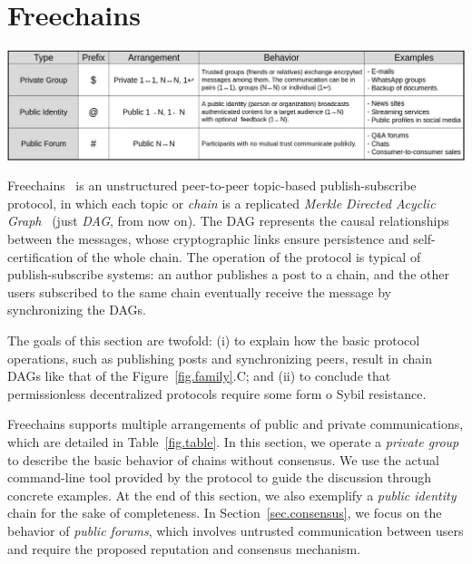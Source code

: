 \documentclass[10pt,journal,compsoc]{IEEEtran}
\newcommand{\FC}       {Freechains\xspace}
\begin{document}

\section{\FC}
\label{sec.freechains}

\begin{table}
\centering
\includegraphics[width=\textwidth]{arrangements.png}
\caption{The three types of chains and arrangements in \FC.}
\label{fig.table}
\end{table}

\FC~\cite{fcs.sbseg20} is an unstructured peer-to-peer topic-based
publish-subscribe protocol, in which each topic or \emph{chain} is a replicated
\emph{Merkle Directed Acyclic Graph}~\cite{p2p.ipfs} (just \emph{DAG}, from now
on).
The DAG represents the causal relationships between the messages, whose
cryptographic links ensure persistence and self-certification of the whole
chain.
The operation of the protocol is typical of publish-subscribe systems: an
author publishes a post to a chain, and the other users subscribed to the same
chain eventually receive the message by synchronizing the DAGs.

The goals of this section are twofold:
    (i)  to explain how the basic protocol operations, such as publishing posts
         and synchronizing peers, result in chain DAGs like that of the
         Figure~\ref{fig.family}.C; and
    (ii) to conclude that permissionless decentralized protocols require some
         form o Sybil resistance.

\FC supports multiple arrangements of public and private communications, which
are detailed in Table~\ref{fig.table}.
In this section, we operate a \emph{private group} to describe the basic
behavior of chains without consensus.
We use the actual command-line tool provided by the protocol to guide the
discussion through concrete examples.
At the end of this section, we also exemplify a \emph{public identity} chain
for the sake of completeness.
In Section~\ref{sec.consensus}, we focus on the behavior of \emph{public
forums}, which involves untrusted communication between users and require the
proposed reputation and consensus mechanism.
\end{document}

